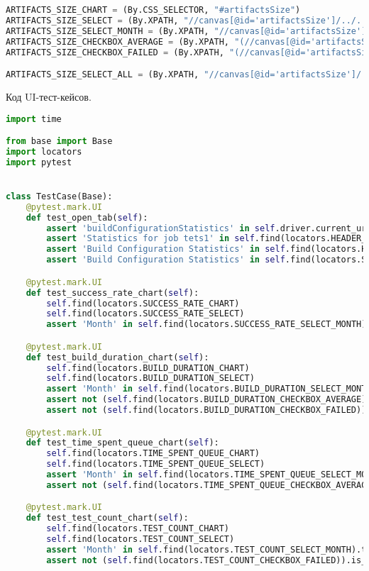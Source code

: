 \begin{lstlisting}[language=Python]
ARTIFACTS_SIZE_CHART = (By.CSS_SELECTOR, "#artifactsSize")
ARTIFACTS_SIZE_SELECT = (By.XPATH, "//canvas[@id='artifactsSize']/../../form//select")
ARTIFACTS_SIZE_SELECT_MONTH = (By.XPATH, "//canvas[@id='artifactsSize']/../../form//select//option")
ARTIFACTS_SIZE_CHECKBOX_AVERAGE = (By.XPATH, "(//canvas[@id='artifactsSize']/../../form//input)[1]")
ARTIFACTS_SIZE_CHECKBOX_FAILED = (By.XPATH, "(//canvas[@id='artifactsSize']/../../form//input)[2]")

ARTIFACTS_SIZE_SELECT_ALL = (By.XPATH, "//canvas[@id='artifactsSize']/../../form//select//option[text()='All']")

\end{lstlisting}

Код UI-тест-кейсов.

\begin{lstlisting}[language=Python]
import time

from base import Base
import locators
import pytest


class TestCase(Base):
    @pytest.mark.UI
    def test_open_tab(self):
        assert 'buildConfigurationStatistics' in self.driver.current_url
        assert 'Statistics for job tets1' in self.find(locators.HEADER_PLUGIN).text
        assert 'Build Configuration Statistics' in self.find(locators.HEADER_LINK_PLUGIN).text
        assert 'Build Configuration Statistics' in self.find(locators.SIDE_LINK_PLUGIN).text

    @pytest.mark.UI
    def test_success_rate_chart(self):
        self.find(locators.SUCCESS_RATE_CHART)
        self.find(locators.SUCCESS_RATE_SELECT)
        assert 'Month' in self.find(locators.SUCCESS_RATE_SELECT_MONTH).text

    @pytest.mark.UI
    def test_build_duration_chart(self):
        self.find(locators.BUILD_DURATION_CHART)
        self.find(locators.BUILD_DURATION_SELECT)
        assert 'Month' in self.find(locators.BUILD_DURATION_SELECT_MONTH).text
        assert not (self.find(locators.BUILD_DURATION_CHECKBOX_AVERAGE)).is_selected()
        assert not (self.find(locators.BUILD_DURATION_CHECKBOX_FAILED)).is_selected()

    @pytest.mark.UI
    def test_time_spent_queue_chart(self):
        self.find(locators.TIME_SPENT_QUEUE_CHART)
        self.find(locators.TIME_SPENT_QUEUE_SELECT)
        assert 'Month' in self.find(locators.TIME_SPENT_QUEUE_SELECT_MONTH).text
        assert not (self.find(locators.TIME_SPENT_QUEUE_CHECKBOX_AVERAGE)).is_selected()

    @pytest.mark.UI
    def test_test_count_chart(self):
        self.find(locators.TEST_COUNT_CHART)
        self.find(locators.TEST_COUNT_SELECT)
        assert 'Month' in self.find(locators.TEST_COUNT_SELECT_MONTH).text
        assert not (self.find(locators.TEST_COUNT_CHECKBOX_FAILED)).is_selected()


\end{lstlisting}
